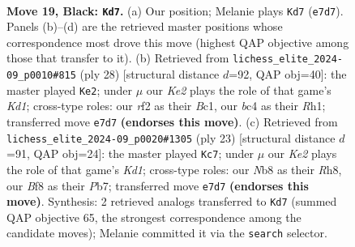 \documentclass[11pt]{article}
\begin{document}
\clearpage

\begin{figure}[p]\centering
\begin{subfigure}{0.46\textwidth}\centering
\resizebox{\linewidth}{!}{%
\newchessgame
\chessboard[
  setfen={rn2bbr1/1p2k1np/4p1p1/p1P3B1/P1B1P3/2N5/1P3RPP/1R2N1K1 b - - 1 19},
  showmover=false,
  pgfstyle=straightmove, color=movearrow, markmove={e7-d7}
]}
\caption{}
\end{subfigure}\hfill
\begin{subfigure}{0.46\textwidth}\centering
\resizebox{\linewidth}{!}{%
\newchessgame
\chessboard[
  setfen={2kr1b1r/pp3p2/2n1pn2/2p4p/4P3/2P1NP2/PPB2P2/R1BK3R w - - 1 15},
  showmover=false,
  pgfstyle=straightmove, color=movearrow, markmove={d1-e2}
]}
\caption{}
\end{subfigure}
\\[4pt]
\begin{subfigure}{0.46\textwidth}\centering
\resizebox{\linewidth}{!}{%
\newchessgame
\chessboard[
  setfen={rn1k1b1r/pp1b1ppp/4p3/2P2n2/4N3/4pP2/PPP3PP/2KRBBNR b - - 1 12},
  showmover=false,
  pgfstyle=straightmove, color=movearrow, markmove={d8-c7}
]}
\caption{}
\end{subfigure}\hfill

\caption{\textbf{Move 19, Black: \texttt{Kd7}.} (a) Our position; Melanie plays \texttt{Kd7} (\texttt{e7d7}). Panels (b)--(d) are the retrieved master positions whose correspondence most drove this move (highest QAP objective among those that transfer to it). (b) Retrieved from \texttt{lichess\_elite\_2024-09\_p0010\#815} (ply 28) [structural distance $d$=92, QAP obj=40]: the master played \texttt{Ke2}; under $\mu$ our \emph{Ke2} plays the role of that game's \emph{Kd1}; cross-type roles: our \emph{r}f2 as their \emph{B}c1, our \emph{b}c4 as their \emph{R}h1; transferred move \texttt{e7d7} \textbf{(endorses this move)}. (c) Retrieved from \texttt{lichess\_elite\_2024-09\_p0020\#1305} (ply 23) [structural distance $d$=91, QAP obj=24]: the master played \texttt{Kc7}; under $\mu$ our \emph{Ke2} plays the role of that game's \emph{Kd1}; cross-type roles: our \emph{N}b8 as their \emph{R}h8, our \emph{B}f8 as their \emph{P}b7; transferred move \texttt{e7d7} \textbf{(endorses this move)}. Synthesis: 2 retrieved analogs transferred to \texttt{Kd7} (summed QAP objective 65, the strongest correspondence among the candidate moves); Melanie committed it via the \texttt{search} selector.}
\label{fig:thought-m37}
\end{figure}
\end{document}
